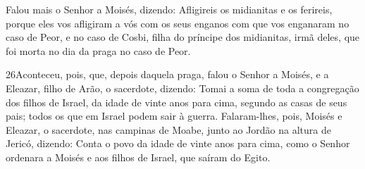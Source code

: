 Falou mais o Senhor a Moisés, dizendo: Afligireis os
midianitas e os ferireis, porque eles vos afligiram a vós com
os seus enganos com que vos enganaram no caso de Peor, e no caso de
Cosbi, filha do príncipe dos midianitas, irmã deles, que foi morta
no dia da praga no caso de Peor.

\medskip

\lettrine{26} Aconteceu, pois, que, depois daquela praga,
falou o Senhor a Moisés, e a Eleazar, filho de Arão, o sacerdote,
dizendo: Tomai a soma de toda a congregação dos filhos de
Israel, da idade de vinte anos para cima, segundo as casas de seus
pais; todos os que em Israel podem sair à guerra. Falaram-lhes,
pois, Moisés e Eleazar, o sacerdote, nas campinas de Moabe, junto ao
Jordão na altura de Jericó, dizendo: Conta o povo da idade de
vinte anos para cima, como o Senhor ordenara a Moisés e aos filhos
de Israel, que saíram do Egito.

